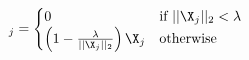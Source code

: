 \documentclass[preview,border=0.3pt]{standalone}
\begin{document}
%
\begin{equation*}
[\mathrm{prox}_{g}(\X)]_j = 
    \begin{cases}
        0&\text{if}\ ||\X_j||_2 < \lambda\\
        \left(1-\frac{\lambda}{||\X_j||_2}\right)\X_j&\text{otherwise}\\
    \end{cases}\label{eq:prox-op}
\end{equation*}
\end{document}
